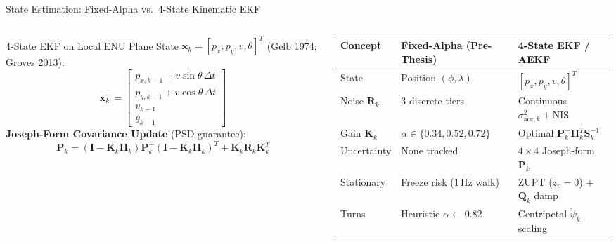 \documentclass[aspectratio=169,10pt]{beamer}
\begin{document}
\begin{frame}{State Estimation: Fixed-Alpha vs.\ 4-State Kinematic EKF}
  \begin{columns}[T]
    \begin{column}{0.47\textwidth}
      \begin{block}{4-State EKF on Local ENU Plane}
        \footnotesize State $\mathbf{x}_k = [p_x, p_y, v, \theta]^T$ (Gelb 1974; Groves 2013):
        \[
          \mathbf{x}_k^- = \begin{bmatrix} p_{x,k-1} + v\sin\theta\,\Delta t \\ p_{y,k-1} + v\cos\theta\,\Delta t \\ v_{k-1} \\ \theta_{k-1} \end{bmatrix}
        \]
        \textbf{Joseph-Form Covariance Update} (PSD guarantee):
        \[
          \mathbf{P}_k = (\mathbf{I}-\mathbf{K}_k\mathbf{H}_k)\mathbf{P}_k^-(\mathbf{I}-\mathbf{K}_k\mathbf{H}_k)^T + \mathbf{K}_k\mathbf{R}_k\mathbf{K}_k^T
        \]
      \end{block}
    \end{column}
    \begin{column}{0.51\textwidth}
      \centering\scriptsize
      \begin{tabular}{@{}p{1.6cm}p{2.3cm}p{2.7cm}@{}}
        \toprule
        \textbf{Concept} & \textbf{Fixed-Alpha (Pre-Thesis)} & \textbf{4-State EKF / AEKF} \\ \midrule
        State & Position $(\phi,\lambda)$ & $[p_x, p_y, v, \theta]^T$ \\
        Noise $\mathbf{R}_k$ & 3 discrete tiers & Continuous $\sigma_{\text{acc},k}^2 + \text{NIS}$ \\
        Gain $\mathbf{K}_k$ & $\alpha \in \{0.34, 0.52, 0.72\}$ & Optimal $\mathbf{P}_k^-\mathbf{H}_k^T\mathbf{S}_k^{-1}$ \\
        Uncertainty & None tracked & $4\times 4$ Joseph-form $\mathbf{P}_k$ \\
        Stationary & Freeze risk ($1$\,Hz walk) & ZUPT ($z_v=0$) + $\mathbf{Q}_k$ damp \\
        Turns & Heuristic $\alpha\leftarrow 0.82$ & Centripetal $\dot{\psi}_k$ scaling \\ \bottomrule
      \end{tabular}
    \end{column}
  \end{columns}
\end{frame}
\end{document}
